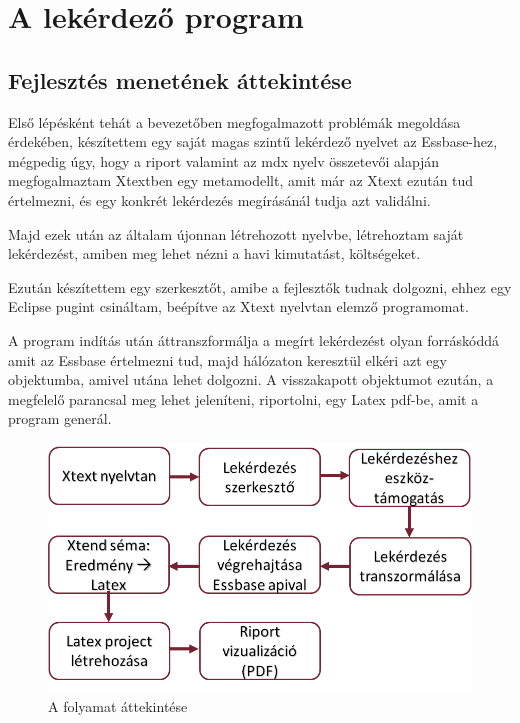 \chapter{A lekérdező program}\label{sect:Ellaboration}
\section{Fejlesztés menetének áttekintése}
Első lépésként tehát a bevezetőben megfogalmazott problémák megoldása érdekében, készítettem egy saját magas szintű lekérdező nyelvet az Essbase-hez, mégpedig úgy, hogy a riport valamint az mdx nyelv összetevői alapján megfogalmaztam Xtextben egy metamodellt, amit már az Xtext ezután tud értelmezni, és egy konkrét lekérdezés megírásánál tudja azt validálni.

Majd ezek után az általam újonnan létrehozott nyelvbe, létrehoztam saját lekérdezést, amiben meg lehet nézni a havi kimutatást, költségeket.

Ezután készítettem egy szerkesztőt, amibe a fejlesztők tudnak dolgozni, ehhez egy Eclipse pugint csináltam, beépítve az Xtext nyelvtan elemző programomat. 

A program indítás után áttranszformálja a megírt lekérdezést olyan forráskóddá amit az Essbase értelmezni tud, majd hálózaton keresztül elkéri azt egy objektumba, amivel utána lehet dolgozni. A visszakapott objektumot ezután, a megfelelő parancsal meg lehet jeleníteni, riportolni, egy Latex pdf-be, amit a program generál.

 \begin{figure}[!ht]
\centering
\includegraphics[width=120mm, keepaspectratio]{figures/overview.png}
\caption{A folyamat áttekintése} 
\label{fig:Overview}
\end{figure}

